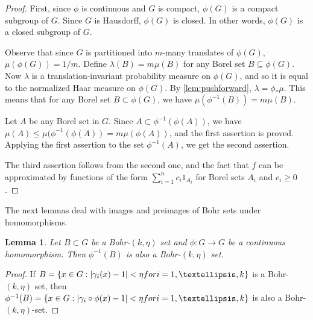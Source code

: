 \documentclass[10pt]{article}
\newtheorem{lemma}[lemma]{Lemma}
\theoremstyle{definition}
\begin{document}
\begin{proof}
First, since $\phi$ is continuous and $G$ is compact, $\phi(G)$ is a compact subgroup of $G$. Since $G$ is Hausdorff, $\phi(G)$ is closed. In other words, $\phi(G)$ is a closed subgroup of $G$. 


Observe that since $G$ is partitioned into $m$-many translates of $\phi(G)$, $\mu(\phi(G)) = 1/m$.
Define $\lambda(B) = m \mu(B)$ for any Borel set $B \subseteq \phi(G)$. Now $\lambda$ is a translation-invariant probability measure on $\phi(G)$, and so it is equal to the normalized Haar measure on $\phi(G)$. By \cref{lem:pushforward}, $\lambda = \phi_* \mu$. This means that for any Borel set $B \subset \phi(G)$, we have $\mu(\phi^{-1}(B)) = m \mu(B)$.

Let $A$ be any Borel set in $G$. Since $A \subset \phi^{-1}(\phi(A))$, we have $\mu(A) \leq \mu(\phi^{-1}(\phi(A)) = m \mu(\phi(A))$, and the first assertion is proved. Applying the first assertion to the set $\phi^{-1}(A)$, we get the second assertion. 

The third assertion follows from the second one, and the fact that $f$ can be approximated by functions of the form $\sum_{i=1}^n c_i 1_{A_i}$ for Borel sets $A_i$ and $c_i \geq 0$.
\end{proof}

The next lemmas deal with images and preimages of Bohr sets under homomorphisms.
 
\begin{lemma} \label{lem:bohr-homo1}
Let $B \subset G$ be a Bohr-$(k, \eta)$ set and $\phi: G \rightarrow G$ be a continuous homomorphism. Then $\phi^{-1}(B)$ is also a Bohr-$(k, \eta)$ set.
\end{lemma}

\begin{proof}
If $B = \{ x \in G: |\gamma_i(x) -1| < \eta \textup{ for }i=1,  \ldots,  k\}$ is a Bohr-$(k, \eta)$ set, then $\phi^{-1}(B) = \{ x \in G: |\gamma_i \circ \phi (x) -1| < \eta \textup{ for }i=1,  \ldots,  k\}$ is also a Bohr-$(k, \eta)$-set.
\end{proof}
\end{document}
